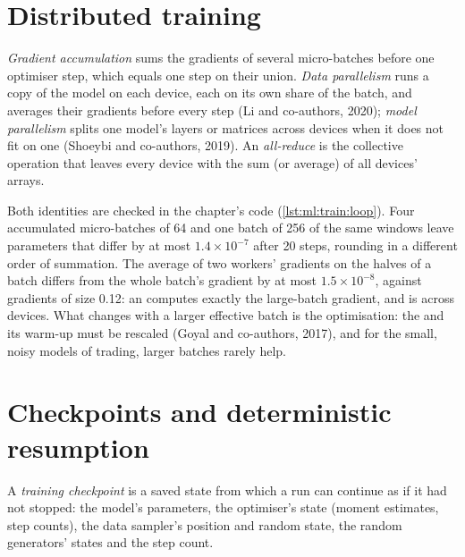 \section{Distributed training}

\begin{definition}\label{def:ml:training-infrastructure:dist}
\emph{Gradient accumulation} sums the gradients of several micro-batches before one optimiser step,
which equals one step on their union. \emph{Data parallelism} runs a copy of the model on each device,
each on its own share of the batch, and averages their gradients before every step (Li and co-authors, 2020); \emph{model
parallelism} splits one model's layers or matrices across devices when it does not fit on one
(Shoeybi and co-authors, 2019). An \emph{all-reduce} is the collective operation that leaves every device with
the sum (or average) of all devices' arrays.
\end{definition}

Both identities are checked in the chapter's code (\cref{lst:ml:train:loop}). Four accumulated micro-batches of 64 and one batch
of 256 of the same windows leave parameters that differ by at most $1.4\times10^{-7}$ after 20 steps, rounding in a different
order of summation. The average of two workers' gradients on the halves of a batch differs from the whole batch's gradient by at
most $1.5\times10^{-8}$, against gradients of size 0.12: an  computes exactly the large-batch gradient, and  is  across devices. What changes with a larger effective batch is the optimisation: the  and its warm-up must be rescaled (Goyal and co-authors, 2017), and for the small, noisy models of trading, larger batches
rarely help.

\section{Checkpoints and deterministic resumption}

\begin{definition}\label{def:ml:training-infrastructure:ckpt}
A \emph{training checkpoint} is a saved state from which a run can continue as if it had not stopped:
the model's parameters, the optimiser's state (moment estimates, step counts), the data sampler's position and random state,
the random generators' states and the step count.
\end{definition}

